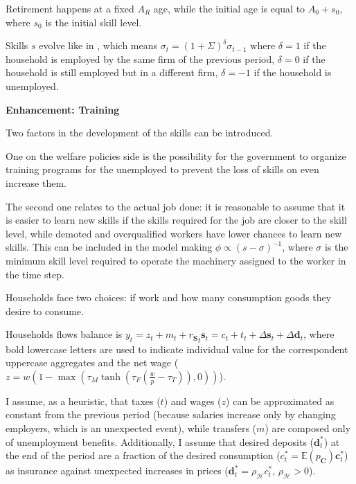 \documentclass[a4paper, headings=standardclasses]{scrartcl}
\newenvironment{enh}[1][]{\begin{framed}\noindent\textbf{Enhancement: #1}\par}{\end{framed}}
\begin{document}
Retirement happens at a fixed $A_R$ age, while the initial age is equal to $A_0 + s_0$, where $s_0$ is the initial skill level.

Skills $s$ evolve like in \textcite{dosi2018}, which means $\sigma_t = (1+\Sigma)^\delta \sigma_{t-1}$ where $\delta=1$ if the household is employed by the same firm of the previous period, $\delta=0$ if the household is still employed but in a different firm, $\delta=-1$ if the household is unemployed.

\begin{enh}[Training]
	Two factors in the development of the skills can be introduced.

	One on the welfare policies side is the possibility for the government to organize training programs for the unemployed to prevent the loss of skills on even increase them.

	The second one relates to the actual job done: it is reasonable to assume that it is easier to learn new skills if the skills required for the job are closer to the skill level, while demoted and overqualified workers have lower chances to learn new skills. This can be included in the model making $\phi \propto (s-\sigma)^{-1}$, where $\sigma$ is the minimum skill level required to operate the machinery assigned to the worker in the time step.
\end{enh}

Households face two choices: if work and how many consumption goods they desire to consume.

Households flows balance is $y_t = z_t + m_t + {r_{\mathbf{S}}}_t \mathbf{s}_t = c_t + t_t + {\Delta \mathbf{s}}_t + {\Delta \mathbf{d}}_t$, where bold lowercase letters are used to indicate individual value for the correspondent uppercase aggregates and the net wage ($z = w (1 - \max(\tau_M \tanh(\tau_F(\frac{w}{p}-\tau_T)),0))$).

I assume, as a heuristic, that taxes ($t$) and wages ($z$) can be approximated as constant from the previous period (because salaries increase only by changing employers, which is an unexpected event), while transfers ($m$) are composed only of unemployment benefits.
Additionally, I assume that desired deposits ($\mathbf{d}^*_t$) at the end of the period are a fraction of the desired consumption ($c^*_t = \mathbb{E}(p_\mathbf{C}) \mathbf{c}^*_t$) as insurance against unexpected increases in prices ($\mathbf{d}^*_t = \rho_\mathcal{H}c^*_t$, $\rho_\mathcal{H} > 0$).
\end{document}
